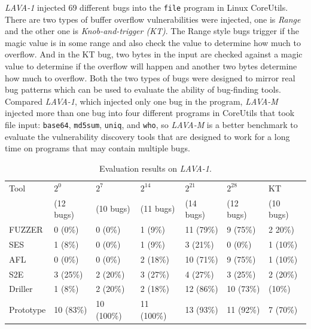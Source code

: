\textit{LAVA-1} injected 69 different bugs into the \texttt{file} program in Linux CoreUtils. There are two types of buffer overflow vulnerabilities were injected, one is \emph{Range} and the other one is \emph{Knob-and-trigger (KT)}. The Range style bugs trigger if the magic value is in some range and also check the value to determine how much to overflow. And in the KT bug, two bytes in the input are checked against a magic value to determine if the overflow will happen and another two bytes determine how much to overflow. Both the two types of bugs were designed to mirror real bug patterns which can be used to evaluate the ability of bug-finding tools. Compared \textit{LAVA-1}, which injected only one bug in the program, \textit{LAVA-M} injected more than one bug into four different programs in CoreUtils that took file input: \texttt{base64}, \texttt{md5sum}, \texttt{uniq}, and \texttt{who}, so \textit{LAVA-M} is a better benchmark to evaluate the vulnerability discovery tools that are designed to work for a long time on programs that may contain multiple bugs.

\begin{table}
  \caption{\label{LAVA-1}Evaluation results on \textit{LAVA-1}.}
  \centering
	\begin{tabular}{p{2cm}<{\centering} p{1.5cm}<{\centering} p{1.6cm}<{\centering}  p{1.6cm}<{\centering}	p{1.5cm}<{\centering} p{1.5cm}<{\centering}  p{1.5cm}<{\centering} }
		\toprule
	    Tool & $2^0$ & $2^7$  & $2^{14}$ & $2^{21}$ & $2^{28}$ & KT \\
	         & (12 bugs) & (10 bugs) & (11 bugs) & (14 bugs) & (12 bugs) & (10 bugs) \\
		\midrule
		FUZZER 		& 0 (0\%)   & 0 (0\%)    & 1 (9\%)    & 11 (79\%) & 9 (75\%)  & 2 20\%) \\
		SES	        & 1 (8\%)   & 0 (0\%)    & 1 (9\%)    & 3 (21\%)  & 0 (0\%)   & 1 (10\%) \\
		AFL		    & 0 (0\%)   & 0 (0\%)    & 2 (18\%)   & 10 (71\%) & 9 (75\%)  & 1 (10\%) \\
		S2E			& 3 (25\%)  & 2 (20\%)   & 3 (27\%)   & 4 (27\%)  & 3 (25\%)  & 2 (20\%) \\
		Driller		& 1 (8\%)   & 2 (20\%)   & 2 (18\%)   & 12 (86\%) & 10 (73\%) &  (10\%) \\
		Prototype	& 10 (83\%) & 10 (100\%) & 11 (100\%) & 13 (93\%) & 11 (92\%) & 7 (70\%) \\
	 \bottomrule
	\end{tabular}
\end{table}

